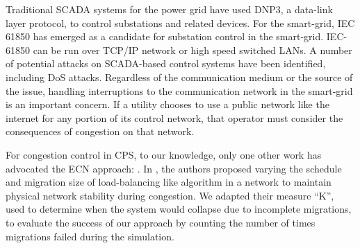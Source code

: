 Traditional \ac{SCADA} systems for the power grid have used \ac{DNP3}, a data-link layer protocol, to control substations and related devices\cite{dnp3}.
For the smart-grid, IEC 61850 has emerged as a candidate for substation control in the smart-grid\cite{iec61850-1}\cite{iec61850-2}\cite{iec61850-3}.
IEC-61850 can be run over TCP/IP network or high speed switched LANs\cite{iec61850-3}.
A number of potential attacks on \ac{SCADA}-based control systems have been identified\cite{smartgrid-security}\cite{smartgrid-attacks}, including \ac{DoS} attacks\cite{scada-attack-dos}\cite{dnp3-attack}.
Regardless of the communication medium or the source of the issue, handling interruptions to the communication network in the smart-grid is an important concern.
If a utility chooses to use a public network like the internet for any portion of its control network, that operator must consider the consequences of congestion on that network\cite{intelligent-control}\cite{plc-communication}\cite{wireless-congestion}.

For congestion control in \ac{CPS}, to our knowledge, only one other work has advocated the \ac{ECN} approach: \cite{ecn-cloudhari}.
In \cite{ecn-cloudhari}, the authors proposed varying the schedule and migration size of load-balancing like algorithm in a network to maintain physical network stability during congestion.
We adapted their measure ``K'', used to determine when the system would collapse due to incomplete migrations, to evaluate the success of our approach by counting the number of times migrations failed during the simulation.

